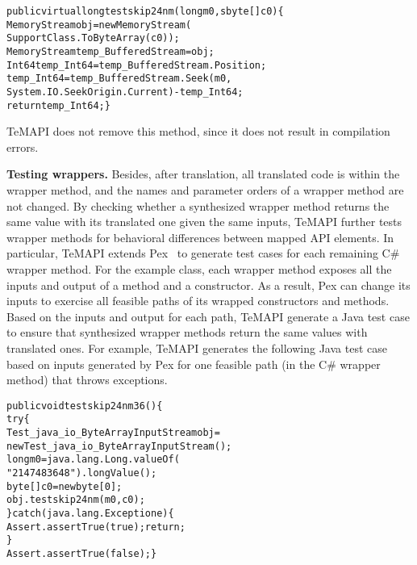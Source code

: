 \begin{CodeOut}
\begin{alltt}
public virtual long testskip24nm(long m0, sbyte[] c0)\{
  MemoryStream obj = new MemoryStream(
                    SupportClass.ToByteArray(c0));
  MemoryStream temp_BufferedStream = obj;
  Int64 temp_Int64 = temp_BufferedStream.Position;
  temp_Int64 = temp_BufferedStream.Seek(m0,
       System.IO.SeekOrigin.Current) - temp_Int64;
  return temp_Int64;\}
\end{alltt}
\end{CodeOut}\vspace*{-2ex}

TeMAPI does not remove this method, since it does not result in compilation errors.


\textbf{Testing wrappers.} Besides, after translation, all translated code is within the wrapper method, and the names and parameter orders of a wrapper method are not changed. By checking whether a synthesized wrapper method returns the same value with its translated one given the same inputs, TeMAPI further tests wrapper methods for behavioral differences between mapped API elements. In particular, TeMAPI extends Pex~\cite{tillmann2008pex} to generate test cases for each remaining C\# wrapper method. For the example class, each wrapper method exposes all the inputs and output of a method and a constructor. As a result, Pex can change its inputs to exercise all feasible paths of its wrapped constructors and methods. Based on the inputs and output for each path, TeMAPI generate a Java test case to ensure that synthesized wrapper methods return the same values with translated ones. For example, TeMAPI generates the following Java test case based on inputs generated by Pex for one feasible path (in the C\# wrapper method) that throws exceptions.

\begin{CodeOut}\vspace*{-1ex}
\begin{alltt}
public void testskip24nm36()\{
  try\{
     Test_java_io_ByteArrayInputStream obj =
        new Test_java_io_ByteArrayInputStream();
     long m0 = java.lang.Long.valueOf(
                  "2147483648").longValue();
     byte[] c0 = new byte[0];
     obj.testskip24nm(m0,c0);
  \}catch(java.lang.Exception e)\{
     Assert.assertTrue(true);return;
  \}
  Assert.assertTrue(false);\}
\end{alltt}
\end{CodeOut}\vspace*{-2ex}

